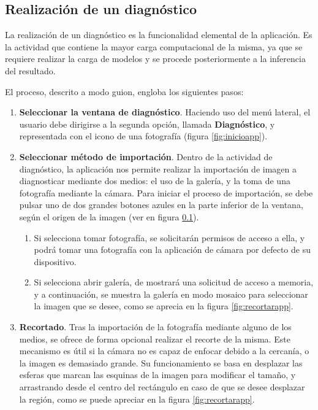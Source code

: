  \subsection{Realización de un diagnóstico}
 
 La realización de un diagnóstico es la funcionalidad elemental de la aplicación. Es la actividad que contiene la mayor carga computacional  de la misma, ya que se requiere realizar la carga de modelos y se procede posteriormente a la inferencia del resultado.
 
 El proceso, descrito a modo guion, engloba los siguientes pasos:
 \begin{enumerate}
 	\item \textbf{Seleccionar la ventana de diagnóstico}. Haciendo uso del menú lateral, el usuario debe dirigirse a la segunda opción, llamada  \textbf{Diagnóstico}, y representada con el icono de una fotografía (figura \ref{fig:inicioapp}).
 	\item \textbf{Seleccionar método de importación}. Dentro de la actividad de diagnóstico, la aplicación nos permite realizar la importación de imagen a diagnosticar mediante dos medios: el uso de la galería, y la toma de una fotografía mediante la cámara. Para iniciar el proceso de importación, se debe pulsar uno de dos grandes botones azules en la parte inferior de la ventana, según el origen de la imagen (ver en figura \ref{}).
 	\begin{enumerate}
 		\item Si selecciona tomar fotografía, se solicitarán permisos de acceso a ella, y podrá tomar una fotografía con la aplicación de cámara por defecto de su dispositivo.
 		\item Si selecciona abrir galería, de mostrará una solicitud de acceso a memoria, y a continuación, se muestra la galería en modo mosaico para seleccionar la imagen que se desee, como se aprecia en la figura \ref{fig:recortarapp}.
 	\end{enumerate}
 	\item \textbf{Recortado}. Tras la importación de la fotografía mediante alguno de los medios, se ofrece de forma opcional realizar el recorte de la misma. Este mecanismo es útil si la cámara no es capaz de enfocar debido a la cercanía, o la imagen es demasiado grande. Su funcionamiento se basa en desplazar las esferas que marcan las esquinas de la imagen para modificar el tamaño, y arrastrando desde el centro del rectángulo en caso de que se desee desplazar la región, como se puede apreciar en la figura \ref{fig:recortarapp}.
 	

\end{enumerate}
